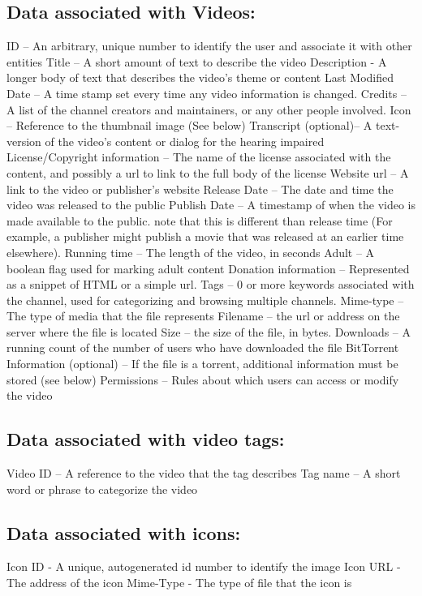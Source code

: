 \documentclass[a4paper,12pt]{report}
\begin{document}
\subsection{Data associated with Videos:}
ID – An arbitrary, unique number to identify the user and associate it with other entities
Title – A short amount of text to describe the video
Description - A longer body of text that describes the video's theme or content
Last Modified Date – A time stamp set every time any video information is changed.
Credits – A list of the channel creators and maintainers, or any other people involved.
Icon – Reference to the thumbnail image (See below)
Transcript (optional)– A text-version of the video's content or dialog for the hearing impaired
License/Copyright information – The name of the license associated with the content, and possibly a url to link to the full body of the license
Website url – A link to the video  or publisher's website
Release Date – The date and time the video was released to the public
Publish Date – A timestamp of when the video is made available to the public. note that this is different than release time (For example, a publisher might publish a movie that was released at an earlier time elsewhere).
Running time – The length of the video, in seconds
Adult – A boolean flag used for marking adult content
Donation information – Represented as a snippet of HTML or a simple url.
Tags – 0 or more keywords associated with the channel, used for categorizing and     browsing multiple channels.
Mime-type – The type of media that the file represents
Filename – the url or address on the server where the file is located
Size – the size of the file, in bytes.
Downloads – A running count of the number of users who have downloaded the file
BitTorrent Information (optional) – If the file is a torrent, additional information must be stored (see below)
Permissions – Rules about which users can access or modify the video


\subsection{Data associated with video tags:}
    Video ID – A reference to the video that the tag describes
    Tag name – A short word or phrase to categorize the video


\subsection{Data associated with icons:}
    Icon ID - A unique, autogenerated id number to identify the image
    Icon URL - The address of the icon
    Mime-Type - The type of file that the icon is
\end{document}
